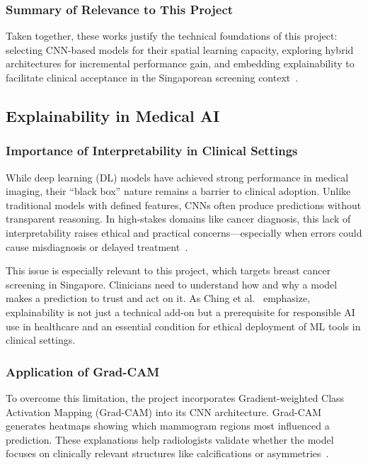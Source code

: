 \documentclass[12pt]{article}
\begin{document}
\subsubsection{Summary of Relevance to This Project}

Taken together, these works justify the technical foundations of this project: selecting CNN-based models for their spatial learning capacity, exploring hybrid architectures for incremental performance gain, and embedding explainability to facilitate clinical acceptance in the Singaporean screening context~\cite{1,6,7}.

\subsection{Explainability in Medical AI}

\subsubsection{Importance of Interpretability in Clinical Settings}

While deep learning (DL) models have achieved strong performance in medical imaging, their “black box” nature remains a barrier to clinical adoption. Unlike traditional models with defined features, CNNs often produce predictions without transparent reasoning. In high-stakes domains like cancer diagnosis, this lack of interpretability raises ethical and practical concerns—especially when errors could cause misdiagnosis or delayed treatment~\cite{3}.

This issue is especially relevant to this project, which targets breast cancer screening in Singapore. Clinicians need to understand how and why a model makes a prediction to trust and act on it. As Ching et al.~\cite{3} emphasize, explainability is not just a technical add-on but a prerequisite for responsible AI use in healthcare and an essential condition for ethical deployment of ML tools in clinical settings.

\subsubsection{Application of Grad-CAM}

To overcome this limitation, the project incorporates Gradient-weighted Class Activation Mapping (Grad-CAM) into its CNN architecture. Grad-CAM generates heatmaps showing which mammogram regions most influenced a prediction. These explanations help radiologists validate whether the model focuses on clinically relevant structures like calcifications or asymmetries~\cite{5}.
\end{document}
